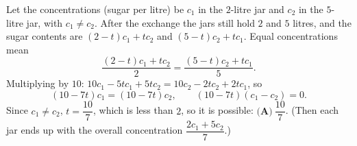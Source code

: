 Let the concentrations (sugar per litre) be $c_1$ in the $2$-litre jar and $c_2$ in the $5$-litre jar, with $c_1\ne c_2$. After the exchange the jars still hold $2$ and $5$ litres, and the sugar contents are $(2-t)c_1+tc_2$ and $(5-t)c_2+tc_1$. Equal concentrations mean
\[
\dfrac{(2-t)c_1+tc_2}{2}=\dfrac{(5-t)c_2+tc_1}{5}.
\]
Multiplying by $10$: $10c_1-5tc_1+5tc_2=10c_2-2tc_2+2tc_1$, so
\[
(10-7t)c_1=(10-7t)c_2,\qquad (10-7t)(c_1-c_2)=0 .
\]
Since $c_1\ne c_2$, $t=\dfrac{10}{7}$, which is less than $2$, so it is possible: $\boxed{\textbf{(A)}\ \dfrac{10}{7}}$. (Then each jar ends up with the overall concentration $\dfrac{2c_1+5c_2}{7}$.)

